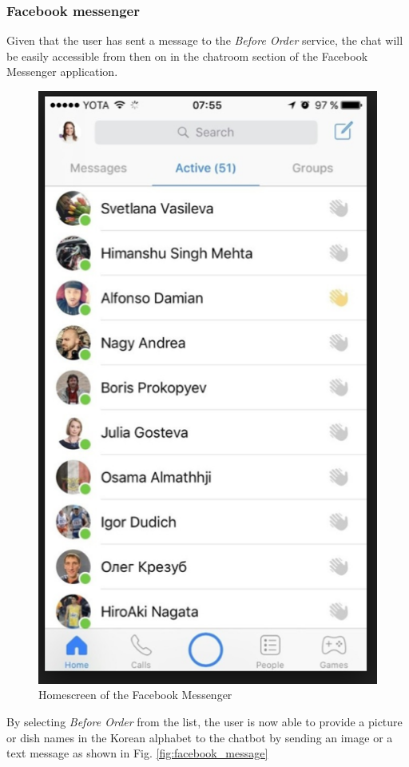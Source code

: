 \subsubsection{Facebook messenger}

Given that the user has sent a message to the \emph{Before Order} service, the chat will be easily accessible from then on in the chatroom section of the Facebook Messenger application.

\begin{figure}[htbp]
\centerline{\includegraphics[height=\custompicheight]{./pictures/facebook_friends}}
\caption{Homescreen of the Facebook Messenger}
\label{fig:facebook_friends}
\end{figure}
\FloatBarrier

By selecting \emph{Before Order} from the list, the user is now able to provide a picture or dish names in the Korean alphabet to the chatbot by sending an image or a text message as shown in Fig. \ref{fig:facebook_message}

